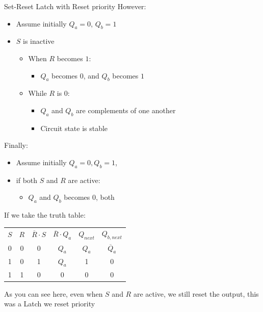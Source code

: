 \begin{parag}{Set-Reset Latch with Reset priority}
       However:
       \begin{itemize}
           \item Assume initially $Q_a = 0$, $Q_b = 1$
           \item $S$ is inactive
               \begin{itemize}
                   \item When $R$ becomes $1$:
                       \begin{itemize}
                           \item $Q_a$ becomes $0$, and $Q_b$ becomes $1$
                       \end{itemize}
                   \item While $R$ is $0$:
                       \begin{itemize}
                           \item $Q_a$ and $Q_b$ are complements of one another
                           \item Circuit state is stable
                       \end{itemize}
               \end{itemize}
       \end{itemize}
       Finally:
       \begin{itemize}
           \item Assume initially $Q_a = 0, Q_b = 1$,
           \item if both $S$ and $R$ are active:
               \begin{itemize}
                   \item $Q_a$ and $Q_b$ becomes $0$, both
               \end{itemize}
       \end{itemize}
       
       If we take the truth table:
       \begin{center}
       \begin{tabular}{cc|cc|cc}
           $S$ & $R$ & $ \overline{R} \cdot S$ & $ \overline{R} \cdot Q_a$ & $Q_{next}$ & $Q_{b, next}$ \\
           0 & 0 & 0 & $Q_a$ & $Q_a$ & $\overline{Q}_a$ \\
           1 & 0 & 1 & $Q_a$ & 1 & 0 \\
           1 & 1 & 0 & 0 & 0 & 0
       \end{tabular}
       \end{center}
       
       As you can see here, even when $S$ and $R$ are active, we still reset the output, this was a Latch we reset priority
        
    
    \end{parag}
    

